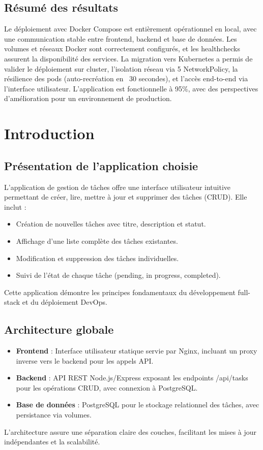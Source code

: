 \documentclass[11pt,a4paper,oneside]{report}
\begin{document}
\section{Résumé des résultats}
Le déploiement avec Docker Compose est entièrement opérationnel en local, avec une communication stable entre frontend, backend et base de données. Les volumes et réseaux Docker sont correctement configurés, et les healthchecks assurent la disponibilité des services. La migration vers Kubernetes a permis de valider le déploiement sur cluster, l'isolation réseau via 5 NetworkPolicy, la résilience des pods (auto-recréation en ~30 secondes), et l'accès end-to-end via l'interface utilisateur. L'application est fonctionnelle à 95\%, avec des perspectives d'amélioration pour un environnement de production.

\chapter{Introduction}

\section{Présentation de l'application choisie}
L'application de gestion de tâches offre une interface utilisateur intuitive permettant de créer, lire, mettre à jour et supprimer des tâches (CRUD). Elle inclut :
\begin{itemize}
\item Création de nouvelles tâches avec titre, description et statut.
\item Affichage d'une liste complète des tâches existantes.
\item Modification et suppression des tâches individuelles.
\item Suivi de l'état de chaque tâche (pending, in progress, completed).
\end{itemize}
Cette application démontre les principes fondamentaux du développement full-stack et du déploiement DevOps.

\section{Architecture globale}
\begin{itemize}
\item \textbf{Frontend} : Interface utilisateur statique servie par Nginx, incluant un proxy inverse vers le backend pour les appels API.
\item \textbf{Backend} : API REST Node.js/Express exposant les endpoints /api/tasks pour les opérations CRUD, avec connexion à PostgreSQL.
\item \textbf{Base de données} : PostgreSQL pour le stockage relationnel des tâches, avec persistance via volumes.
\end{itemize}
L'architecture assure une séparation claire des couches, facilitant les mises à jour indépendantes et la scalabilité.
\end{document}
